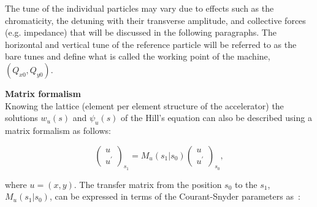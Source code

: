 The tune of the individual particles may vary due to effects such as the chromaticity, the detuning with their transverse amplitude, and collective forces (e.g. impedance) that will be discussed in the following paragraphs. The horizontal and vertical tune of the reference particle will be referred to as the bare tunes and define what is called the working point of the machine, $(Q_{x0}, Q_{y0})$. 

\textbf{Matrix formalism}\\
Knowing the lattice (element per element structure of the accelerator) the solutions $w_u(s)$ and $\psi_u(s)$ of the Hill's equation can also be described using a matrix formalism as follows:

\begin{equation}\label{eq:matrix_formalism_intro}
   \begin{pmatrix}
    u\\ 
    u^\prime
    \end{pmatrix}_{s_1} = M_u (s_1 |  s_0) \begin{pmatrix}
    u\\ 
    u^\prime
    \end{pmatrix}_{s_0},
\end{equation}

where $u=(x,y)$. The transfer matrix from the position $s_0$ to the $s_1$, $M_u (s_1 | s_0)$, can be expressed in terms of the Courant-Snyder parameters as~\cite{Lee:1425444}: %

